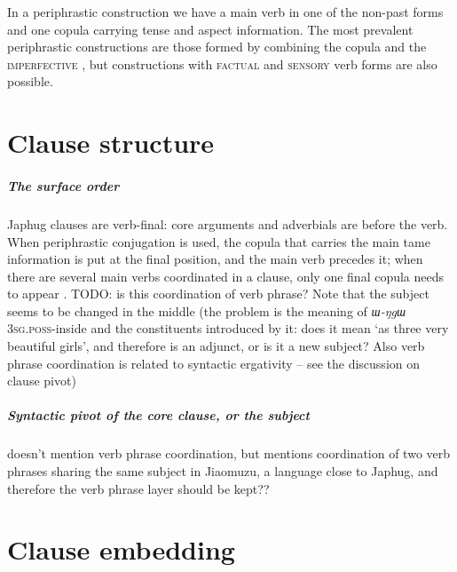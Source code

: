 \documentclass[a4paper, oneside, 12pt]{report}
\newcommand*{\citesec}[1]{\S~{#1}}
\newcommand*{\citepage}[1]{p.~{#1}}
\newcommand*{\citepages}[1]{pp.~{#1}}
\newcommand{\form}[1]{\emph{#1}}
\newcommand{\category}[1]{\textsc{#1}}
\newcommand{\translate}[1]{`#1'}
\begin{document}
In a periphrastic construction we have a main verb in one of the non-past forms 
and one copula carrying tense and aspect information.
The most prevalent periphrastic constructions 
are those formed by combining the copula and the \category{imperfective} 
\citep[\citepage{1089}]{jacques2021grammar},
but constructions with \category{factual} \citep[\citesec{21.3.1.4}]{jacques2021grammar}
and \category{sensory} verb forms are also possible. 

\chapter{Clause structure}

\paragraph*{The surface order}

Japhug clauses are verb-final:
core arguments and adverbials are before the verb.
When periphrastic conjugation is used, 
the copula that carries the main \ac{tame} information 
is put at the final position, 
and the main verb precedes it; 
when there are several main verbs coordinated in a clause, 
only one final copula needs to appear \citep[\citepages{1090-1091}]{jacques2021grammar}.
TODO: is this coordination of verb phrase? 
Note that the subject seems to be changed in the middle 
(the problem is the meaning of \form{ɯ-ŋgɯ} \category{3sg.poss}-inside
and the constituents introduced by it: 
does it mean \translate{as three very beautiful girls}, 
and therefore is an adjunct, or is it a new subject? 
Also verb phrase coordination is related to syntactic ergativity -- 
see the discussion on clause pivot)

\paragraph*{Syntactic pivot of the core clause, or the subject} 

\citet{jacques2021grammar} doesn't mention verb phrase coordination,
but \citet[\citepage{549}]{prins2011web} mentions 
coordination of two verb phrases sharing the same subject
in Jiaomuzu, a language close to Japhug,
and therefore the verb phrase layer should be kept??



\chapter{Clause embedding}
\end{document}
